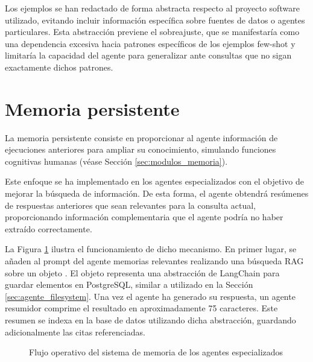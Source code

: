 Los ejemplos se han redactado de forma abstracta respecto al proyecto software utilizado, evitando incluir información específica sobre fuentes de datos o agentes particulares. Esta abstracción previene el sobreajuste, que se manifestaría como una dependencia excesiva hacia patrones específicos de los ejemplos few-shot y limitaría la capacidad del agente para generalizar ante consultas que no sigan exactamente dichos patrones.

\section{Memoria persistente}
La memoria persistente consiste en proporcionar al agente información de ejecuciones anteriores para ampliar su conocimiento, simulando funciones cognitivas humanas (véase Sección \ref{sec:modulos_memoria}).

Este enfoque se ha implementado en los agentes especializados con el objetivo de mejorar la búsqueda de información. De esta forma, el agente obtendrá resúmenes de respuestas anteriores que sean relevantes para la consulta actual, proporcionando información complementaria que el agente podría no haber extraído correctamente.

La Figura \ref{fig:mem_1} ilustra el funcionamiento de dicho mecanismo. En primer lugar, se añaden al prompt del agente memorias relevantes realizando una búsqueda RAG sobre un objeto . El objeto representa una abstracción de LangChain para guardar elementos en PostgreSQL, similar a  utilizado en la Sección \ref{sec:agente_filesystem}. Una vez el agente ha generado su respuesta, un agente resumidor comprime el resultado en aproximadamente 75 caracteres. Este resumen se indexa en la base de datos utilizando dicha abstracción, guardando adicionalmente las citas referenciadas. 

\begin{figure}[h]
\centering
{}
\caption{Flujo operativo del sistema de memoria de los agentes especializados}
\label{fig:mem_1}
\end{figure}

